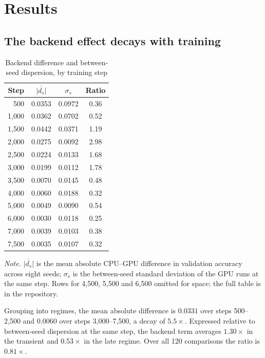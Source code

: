 \documentclass[jou,11pt,donotrepeattitle]{apa7}
\begin{document}
\section{Results}

\subsection{The backend effect decays with training}

\begin{table}[htbp]
\caption{Backend difference and between-seed dispersion, by training step}
\label{tab:main}
\small
\begin{tabular}{rccc}
\toprule
Step & $\overline{|d_s|}$ & $\sigma_s$ & Ratio \\
\midrule
500   & 0.0353 & 0.0972 & 0.36 \\
1{,}000  & 0.0362 & 0.0702 & 0.52 \\
1{,}500  & 0.0442 & 0.0371 & 1.19 \\
2{,}000  & 0.0275 & 0.0092 & 2.98 \\
2{,}500  & 0.0224 & 0.0133 & 1.68 \\
3{,}000  & 0.0199 & 0.0112 & 1.78 \\
3{,}500  & 0.0070 & 0.0145 & 0.48 \\
4{,}000  & 0.0060 & 0.0188 & 0.32 \\
5{,}000  & 0.0049 & 0.0090 & 0.54 \\
6{,}000  & 0.0030 & 0.0118 & 0.25 \\
7{,}000  & 0.0039 & 0.0103 & 0.38 \\
7{,}500  & 0.0035 & 0.0107 & 0.32 \\
\bottomrule
\end{tabular}

\vspace{5pt}
{\small\raggedright \textit{Note.} $\overline{|d_s|}$ is the mean absolute CPU--GPU difference in
validation accuracy across eight seeds; $\sigma_s$ is the between-seed standard deviation of the
GPU runs at the same step. Rows for 4{,}500, 5{,}500 and 6{,}500 omitted for space; the full
table is in the repository.\par}
\end{table}

Grouping into regimes, the mean absolute difference is $0.0331$ over steps 500--2{,}500 and
$0.0060$ over steps 3{,}000--7{,}500, a decay of $5.5\times$. Expressed relative to between-seed
dispersion at the same step, the backend term averages $1.30\times$ in the transient and
$0.53\times$ in the late regime. Over all 120 comparisons the ratio is $0.81\times$.
\end{document}

